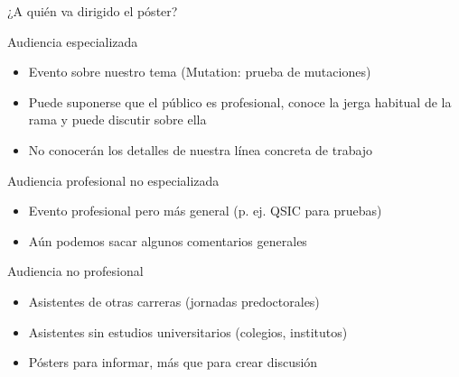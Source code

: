 \documentclass[xcolor=svgnames,compress]{beamer}
\begin{document}
\begin{frame}{¿A quién va dirigido el póster?}

  \begin{block}{Audiencia especializada}
    \begin{itemize}
    \item Evento sobre nuestro tema (Mutation: prueba de mutaciones)
    \item Puede suponerse que el público es profesional, conoce la jerga
      habitual de la rama y puede discutir sobre ella
    \item No conocerán los detalles de nuestra línea concreta de trabajo
    \end{itemize}
  \end{block}

  \begin{block}{Audiencia profesional no especializada}
    \begin{itemize}
    \item Evento profesional pero más general (p. ej. QSIC para pruebas)
    \item Aún podemos sacar algunos comentarios generales
    \end{itemize}
  \end{block}

  \begin{block}{Audiencia no profesional}
    \begin{itemize}
    \item Asistentes de otras carreras (jornadas predoctorales)
    \item Asistentes sin estudios universitarios (colegios, institutos)
    \item Pósters para informar, más que para crear discusión
    \end{itemize}
  \end{block}

\end{frame}
\end{document}
